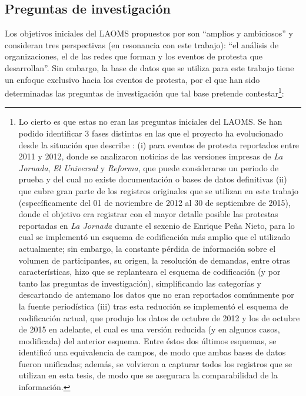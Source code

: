 \documentclass[letterpaper, 11pt]{book}
\theoremstyle{definition}
\theoremstyle{remark}
\begin{document}
\subsection{Preguntas de investigación}
\label{sec:BaseDDLAOMS}

Los objetivos iniciales del LAOMS propuestos por \citet{2010_Cadena_LAOMS} son ``amplios y ambiciosos'' y consideran tres perspectivas (en resonancia con este trabajo): ``el análisis de organizaciones, el de las redes que forman y los eventos de protesta que desarrollan''. 
Sin embargo, la base de datos que se utiliza para este trabajo tiene un enfoque exclusivo hacia los eventos de protesta, por el que han sido determinadas las preguntas de investigación que tal base pretende contestar\footnote{
Lo cierto es que estas no eran las preguntas iniciales del LAOMS. 
Se han podido identificar 3 fases distintas en las que el proyecto ha evolucionado desde la situación que describe \citet{2010_Cadena_LAOMS}: 
(i) para eventos de protesta reportados entre 2011 y 2012, donde se analizaron noticias de las versiones impresas de \emph{La Jornada}, \emph{El Universal} y \emph{Reforma}, que puede considerarse un periodo de prueba y del cual no existe documentación o bases de datos definitivas 
(ii) que cubre gran parte de los registros originales que se utilizan en este trabajo (específicamente del 01 de noviembre de 2012 al 30 de septiembre de 2015), donde el objetivo era registrar con el mayor detalle posible las protestas reportadas en \emph{La Jornada} durante el sexenio de Enrique Peña Nieto, para lo cual se implementó un esquema de codificación más amplio que el utilizado actualmente; sin embargo, la constante pérdida de información sobre el volumen de participantes, su origen, la resolución de demandas, entre otras características, hizo que se replanteara el esquema de codificación (y por tanto las preguntas de investigación), simplificando las categorías y descartando de antemano los datos que no eran reportados comúnmente por la fuente periodística 
(iii) tras esta reducción se implementó el esquema de codificación actual, que produjo los datos de octubre de 2012 y los de octubre de 2015 en adelante, el cual es una versión reducida (y en algunos casos, modificada) del anterior esquema. Entre éstos dos últimos esquemas, se identificó una equivalencia de campos, de modo que ambas bases de datos fueron unificadas; además, se volvieron a capturar todos los registros que se utilizan en esta tesis, de modo que se asegurara la comparabilidad de la información.}:
\end{document}

